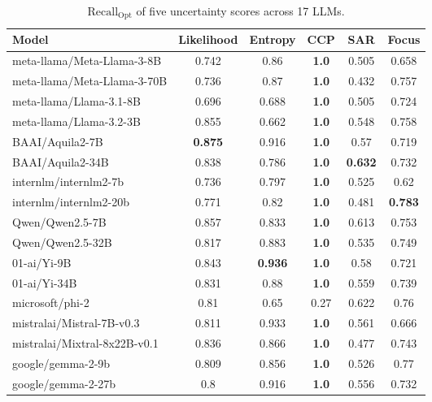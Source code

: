 \begin{table*}[t]
    \centering
    \small 
    \begin{tabular}{lccccc}
        \toprule
        Model & Likelihood & Entropy & CCP & SAR & Focus \\
\midrule
meta-llama/Meta-Llama-3-8B & 0.742 & 0.86 & \textbf{1.0} & 0.505 & 0.658 \\
meta-llama/Meta-Llama-3-70B & 0.736 & 0.87 & \textbf{1.0} & 0.432 & 0.757 \\
meta-llama/Llama-3.1-8B & 0.696 & 0.688 & \textbf{1.0} & 0.505 & 0.724 \\
meta-llama/Llama-3.2-3B & 0.855 & 0.662 & \textbf{1.0} & 0.548 & 0.758 \\
BAAI/Aquila2-7B & \textbf{0.875} & 0.916 & \textbf{1.0} & 0.57 & 0.719 \\
BAAI/Aquila2-34B & 0.838 & 0.786 & \textbf{1.0} & \textbf{0.632} & 0.732 \\
internlm/internlm2-7b & 0.736 & 0.797 & \textbf{1.0} & 0.525 & 0.62 \\
internlm/internlm2-20b & 0.771 & 0.82 & \textbf{1.0} & 0.481 & \textbf{0.783} \\
Qwen/Qwen2.5-7B & 0.857 & 0.833 & \textbf{1.0} & 0.613 & 0.753 \\
Qwen/Qwen2.5-32B & 0.817 & 0.883 & \textbf{1.0} & 0.535 & 0.749 \\
01-ai/Yi-9B & 0.843 & \textbf{0.936} & \textbf{1.0} & 0.58 & 0.721 \\
01-ai/Yi-34B & 0.831 & 0.88 & \textbf{1.0} & 0.559 & 0.739 \\
microsoft/phi-2 & 0.81 & 0.65 & 0.27 & 0.622 & 0.76 \\
mistralai/Mistral-7B-v0.3 & 0.811 & 0.933 & \textbf{1.0} & 0.561 & 0.666 \\
mistralai/Mixtral-8x22B-v0.1 & 0.836 & 0.866 & \textbf{1.0} & 0.477 & 0.743 \\
google/gemma-2-9b & 0.809 & 0.856 & \textbf{1.0} & 0.526 & 0.77 \\
google/gemma-2-27b & 0.8 & 0.916 & \textbf{1.0} & 0.556 & 0.732 \\
        \bottomrule
    \end{tabular}
    \caption{
     $\mathrm{Recall}_\mathrm{Opt}$ of five uncertainty scores across 17 LLMs.
    }
    \label{tb:recall_opt_17models}
\end{table*}